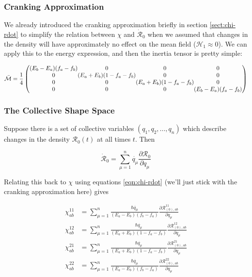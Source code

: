 \subsubsection{Cranking Approximation}

We already introduced the cranking approximation briefly in section \ref{sect:chi-rdot} to simplify the relation between $\chi$ and $\mathcal{\dot{R}}_0$ when we assumed that changes in the density will have approximately no effect on the mean field ($\mathcal{H}_1 \approx 0$). We can apply this to the energy expression, and then the inertia tensor is pretty simple:

\begin{equation}\label{eqn:cranked_ATDHFB}
\mathcal{\bar{M}} = \frac{1}{4}\left(\begin{array}{@{}c@{}c@{}c@{}c@{}}
(E_b-E_a)(f_a-f_b) & 0                     & 0                     & 0 \\
0                  & (E_a+E_b)(1-f_a-f_b) & 0                     & 0 \\
0                  & 0                     & (E_a+E_b)(1-f_a-f_b)  & 0 \\
0                  & 0                     & 0                     & (E_b-E_a)(f_a-f_b)
\end{array}\right)
\end{equation}

\subsubsection{The Collective Shape Space}

Suppose there is a set of collective variables $(q_1,q_2,\dots,q_n)$ which describe changes in the density $\mathcal{R}_0(t)$ at all times $t$. Then

\begin{equation*}
\mathcal{\dot{R}}_0 = \sum_{\mu=1}^{n}\dot{q_\mu}\frac{\partial\mathcal{R}_0}{\partial q_\mu}
\end{equation*}

\noindent Relating this back to $\chi$ using equations \ref{eqn:chi-rdot} (we'll just stick with the cranking approximation here) gives

\begin{align*}
\chi^{11}_{ab} &= \sum_{\mu=1}^{n}\frac{\hbar\dot{q_\mu}}{(E_a-E_b)(f_b-f_a)}\frac{\partial\mathcal{R}^{11}_{(0),ab}}{\partial q_\mu} \\
\chi^{12}_{ab} &= \sum_{\mu=1}^{n}\frac{\hbar\dot{q_\mu}}{(E_a+E_b)(1-f_a-f_b)}\frac{\partial\mathcal{R}^{12}_{(0),ab}}{\partial q_\mu} \\
\chi^{21}_{ab} &= \sum_{\mu=1}^{n}\frac{\hbar\dot{q_\mu}}{(E_a+E_b)(1-f_a-f_b)}\frac{\partial\mathcal{R}^{21}_{(0),ab}}{\partial q_\mu} \\
\chi^{22}_{ab} &= \sum_{\mu=1}^{n}\frac{\hbar\dot{q_\mu}}{(E_a-E_b)(f_b-f_a)}\frac{\partial\mathcal{R}^{22}_{(0),ab}}{\partial q_\mu} \\
\end{align*}

